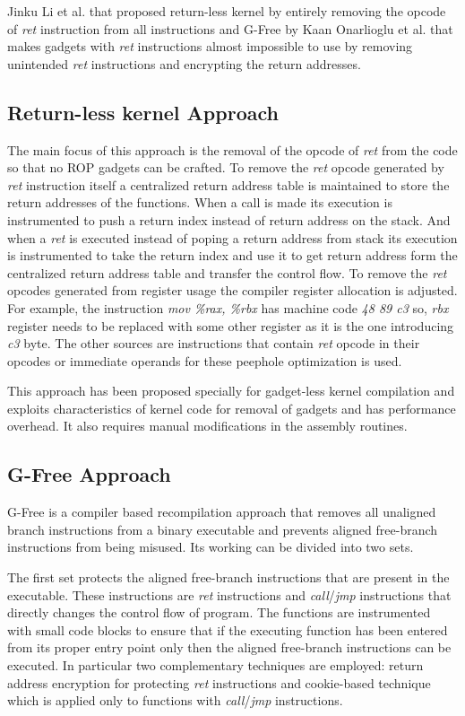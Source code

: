 \documentclass{article}
\begin{document}
\begin{multicols}{2}
	Jinku Li et al.\cite{kernel} that proposed return-less kernel by entirely removing the opcode of \textit{ret} instruction from all instructions and G-Free by Kaan Onarlioglu et al.\cite{gfree} that makes gadgets with \textit{ret} instructions almost impossible to use by removing unintended \textit{ret} instructions and encrypting the return addresses.
	
	\subsection{Return-less kernel Approach}
	The main focus of this approach is the removal of the opcode of \textit{ret} from the code so that no ROP gadgets can be crafted. To remove the \textit{ret} opcode generated by \textit{ret} instruction itself a centralized return address table is maintained to store the return addresses of the functions. When a call is made its execution is instrumented to push a return index instead of return address on the stack. And when a \textit{ret} is executed instead of poping a return address from stack its execution is instrumented to take the return index and use it to get return address form the centralized return address table and transfer the control flow. To remove the \textit{ret} opcodes generated from register usage the compiler register allocation is adjusted. For example, the instruction \textit{mov \%rax, \%rbx} has machine code \textit{48 89 c3} so, \textit{rbx} register needs to be replaced with some other register as it is the one introducing \textit{c3} byte. The other sources are instructions that contain \textit{ret} opcode in their opcodes or immediate operands for these peephole optimization is used.
	
	This approach has been proposed specially for gadget-less kernel compilation and exploits characteristics of kernel code for removal of gadgets and has performance overhead. It also requires manual modifications in the assembly routines.
	
	\subsection{G-Free Approach}
	G-Free is a compiler based recompilation approach that removes all unaligned branch instructions from a binary executable and prevents aligned free-branch instructions from being misused. Its working can be divided into two sets.
	
	The first set protects the aligned free-branch instructions that are present in the executable. These instructions are \textit{ret} instructions and \textit{call}/\textit{jmp} instructions that directly changes the control flow of program. The functions are instrumented with small code blocks to ensure that if the executing function has been entered from its proper entry point only then the aligned free-branch instructions can be executed. In particular two complementary techniques are employed: return address encryption for protecting \textit{ret} instructions and cookie-based technique which is applied only to functions with \textit{call}/\textit{jmp} instructions.
	

\end{multicols}
\end{document}
